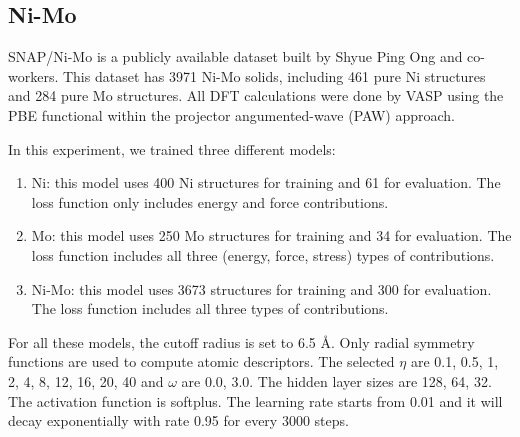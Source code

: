 \documentclass[preprint]{revtex4-2}
\begin{document}
\subsection{Ni-Mo}

SNAP/Ni-Mo\cite{SNAP_Mo_2017, SNAP_2018} is a publicly available dataset built 
by Shyue Ping Ong and co-workers. This dataset has 3971 Ni-Mo solids, including 
461 pure Ni structures and 284 pure Mo structures. All DFT calculations were 
done by VASP\cite{VASP} using the PBE\cite{PBE} functional within the projector 
angumented-wave (PAW)\cite{PAW} approach.

In this experiment, we trained three different models:
\begin{enumerate}
    
    \item Ni: this model uses 400 Ni structures for training and 61 for 
    evaluation. The loss function only includes energy and force contributions.
    
    \item Mo: this model uses 250 Mo structures for training and 34 for 
    evaluation. The loss function includes all three (energy, force, stress) 
    types of contributions. 
    
    \item Ni-Mo: this model uses 3673 structures for training and 300 for 
    evaluation. The loss function includes all three types of contributions.

\end{enumerate}

For all these models, the cutoff radius is set to 6.5 \AA. Only radial symmetry 
functions are used to compute atomic descriptors. The selected $\eta$ are 
0.1, 0.5, 1, 2, 4, 8, 12, 16, 20, 40 and $\omega$ are 0.0, 3.0. The hidden layer
sizes are 128, 64, 32. The activation function is softplus.
The learning rate starts from 0.01 and it will decay exponentially with rate 
0.95 for every 3000 steps.
\end{document}
